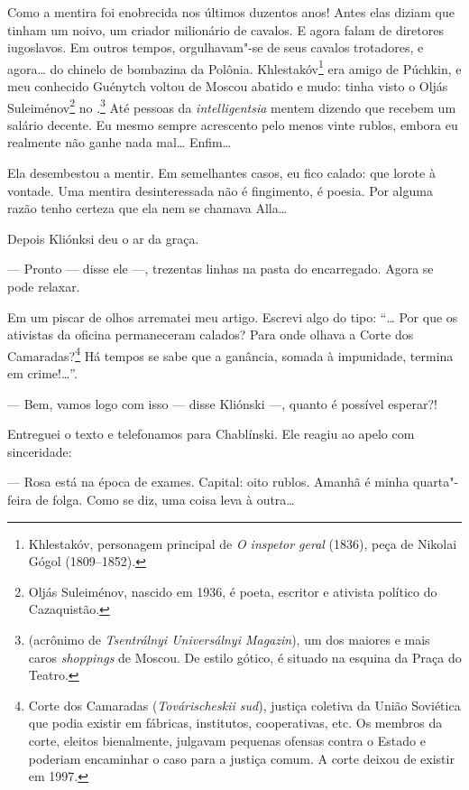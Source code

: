 Como a mentira foi enobrecida nos últimos duzentos anos! Antes elas
diziam que tinham um noivo, um criador milionário de cavalos. E agora
falam de diretores iugoslavos. Em outros tempos, orgulhavam"-se de seus
cavalos trotadores, e agora\ldots{} do chinelo de bombazina da Polônia.
Khlestakóv\footnote{Khlestakóv, personagem principal de \emph{O inspetor
  geral} (1836), peça de Nikolai Gógol (1809--1852).} era amigo
de Púchkin, e meu conhecido Guénytch voltou de Moscou abatido e mudo:
tinha visto o Oljás Suleiménov\footnote{Oljás Suleiménov, nascido em
  1936, é poeta, escritor e ativista político do Cazaquistão.} no
.\footnote{ (acrônimo de \emph{Tsentrálnyi Universálnyi
  Magazin}), um dos maiores e mais caros \emph{shoppings} de Moscou. De
  estilo gótico, é situado na esquina da Praça do Teatro.} Até pessoas
da \emph{intelligentsia} mentem dizendo que recebem um salário decente.
Eu mesmo sempre acrescento pelo menos vinte rublos, embora eu realmente
não ganhe nada mal\ldots{} Enfim\ldots{}

Ela desembestou a mentir. Em semelhantes casos, eu fico calado: que
lorote à vontade. Uma mentira desinteressada não é fingimento, é poesia.
Por alguma razão tenho certeza que ela nem se chamava Alla\ldots{}

Depois Kliónksi deu o ar da graça.

--- Pronto --- disse ele ---, trezentas linhas na pasta do encarregado.
Agora se pode relaxar.

Em um piscar de olhos arrematei meu artigo. Escrevi algo do tipo: ``\ldots{}
Por que os ativistas da oficina permaneceram calados? Para onde olhava a
Corte dos Camaradas?\footnote{Corte dos Camaradas (\emph{Továrischeskii
  sud}), justiça coletiva da União Soviética que podia existir em
  fábricas, institutos, cooperativas, etc. Os membros da corte, eleitos
  bienalmente, julgavam pequenas ofensas contra o Esta­do e poderiam
  encaminhar o caso para a justiça comum. A corte deixou de existir em
  1997.} Há tempos se sabe que a ganância, somada à impunidade, termina
em crime!\ldots{}''.

--- Bem, vamos logo com isso --- disse Kliónski ---, quanto é possível
esperar?!

Entreguei o texto e telefonamos para Chablínski. Ele reagiu ao apelo com
sinceridade:

--- Rosa está na época de exames. Capital: oito rublos. Amanhã é minha
quarta"-feira de folga. Como se diz, uma coisa leva à outra\ldots{}

